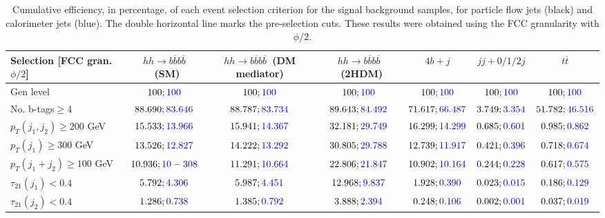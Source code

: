 \begin{landscape}
		\begin{table}
			\centering
			\caption{Cumulative efficiency, in percentage, of each event selection criterion for the signal background samples, for particle flow jets (black) and calorimeter jets (blue). The double horizontal line marks the pre-selection cuts. These results were obtained using the FCC granularity with $\phi/2$.}
			\begin{tabular}{lcccccc}
				\toprule 
				\textbf{Selection [FCC gran. $\phi/2$]} & $hh\rightarrow b\overline{b}b\overline{b}$~(SM) & $hh\rightarrow b\overline{b}b\overline{b}$~(DM mediator) & $hh\rightarrow b\overline{b}b\overline{b}$~(2HDM) & $4b+j$  & $jj+0/1/2 j$ & $t\overline{t}$ \\
				\midrule
				Gen level & $100;\textcolor{blue}{100}$ & $100;\textcolor{blue}{100}$ &$100;\textcolor{blue}{100}$& $100;\textcolor{blue}{100}$& $100;\textcolor{blue}{100}$& $100;\textcolor{blue}{100}$ \\
				\rowcolor{black!7}No. b-tags$\geq 4$&$88.690;\textcolor{blue}{83.646}$&$88.787;\textcolor{blue}{83.734}$&$89.643;\textcolor{blue}{84.492}$&$71.617;\textcolor{blue}{66.487}$&$3.749;\textcolor{blue}{3.354}$&$51.782;\textcolor{blue}{46.516}$\\
				$p_T(j_1,j_2)\geq200$ GeV & $15.533;\textcolor{blue}{13.966}$ & $15.941;\textcolor{blue}{14.367}$&$32.181;\textcolor{blue}{29.749}$ &$16.299;\textcolor{blue}{14.299}$&$0.685;\textcolor{blue}{0.601}$&$0.985;\textcolor{blue}{0.862}$\\ 
				\midrule \midrule
				\rowcolor{black!7}$p_T(j_1)\geq 300$ GeV & $13.526;\textcolor{blue}{12.827}$ &$14.222;\textcolor{blue}{13.292}$  &$30.805;\textcolor{blue}{29.788}$&$12.739;\textcolor{blue}{11.917}$&$0.421;\textcolor{blue}{0.396}$&$0.718;\textcolor{blue}{0.674}$\\ 
				$p_T(j_1+j_2)\geq 100$ GeV &$10.936;\textcolor{blue}{10-308}$ & $11.291;\textcolor{blue}{10.664}$ &$22.806;\textcolor{blue}{21.847}$&$10.902;\textcolor{blue}{10.164}$&$0.244;\textcolor{blue}{0.228}$&$0.617;\textcolor{blue}{0.575}$\\
				\rowcolor{black!7}$\tau_{21}(j_1)<0.4$ & $5.792;\textcolor{blue}{4.306}$& $5.987;\textcolor{blue}{4.451}$&$12.968;\textcolor{blue}{9.837}$&$1.928;\textcolor{blue}{0.390}$&$0.023;\textcolor{blue}{0.015}$&$0.186;\textcolor{blue}{0.129}$\\
				$\tau_{21}(j_2)<0.4$ &$1.286;\textcolor{blue}{0.738}$ &$1.385;\textcolor{blue}{0.792}$ &$3.888;\textcolor{blue}{2.394}$&$0.248;\textcolor{blue}{0.106}$&$0.002;\textcolor{blue}{0.001}$&$0.037;\textcolor{blue}{0.019}$\\

\end{tabular}
\end{table}
\end{landscape}
